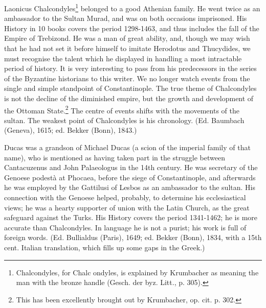 
Laonicus Chalcondyles\footnote{Chalcondyles, for Chalc ondyles, is explained by Krumbacher as meaning the man with the bronze handle (Gesch. der byz. Litt., p. 305).} belonged to a good Athenian family. He went twice as an ambassador to the Sultan Murad, and was on both occasions imprisoned. His History in 10 books covers the period 1298-1463, and thus includes the fall of the Empire of Trebizond. He was a man of great ability, and, though we may wish that he had not set it before himself to imitate Herodotus and Thucydides, we must recognise the talent which he displayed in handling a most intractable period of history. It is very interesting to pass from his predecessors in the series of the Byzantine historians to this writer. We no longer watch events from the single and simple standpoint of Constantinople. The true theme of Chalcondyles is not the decline of the diminished empire, but the growth and development of the Ottoman State.\footnote{This has been excellently brought out by Krumbacher, op. cit. p. 302.} The centre of events shifts with the movements of the sultan. The weakest point of Chalcondyles is his chronology. (Ed. Baumbach (Geneva), 1615; ed. Bekker (Bonn), 1843.)

Ducas was a grandson of Michael Ducas (a scion of the imperial family of that name), who is mentioned as having taken part in the struggle between Cantacuzenus and John Palaeologus in the 14th century. He was secretary of the Genoese podestà at Phocaea, before the siege of Constantinople, and afterwards he was employed by the Gattilusi of Lesbos as an ambassador to the sultan. His connection with the Genoese helped, probably, to determine his ecclesiastical views; he was a hearty supporter of union with the Latin Church, as the great safeguard against the Turks. His History covers the period 1341-1462; he is more accurate than Chalcondyles. In language he is not a purist; his work is full of foreign words. (Ed. Bullialdus (Paris), 1649; ed. Bekker (Bonn), 1834, with a 15th cent. Italian translation, which fills up some gaps in the Greek.)

